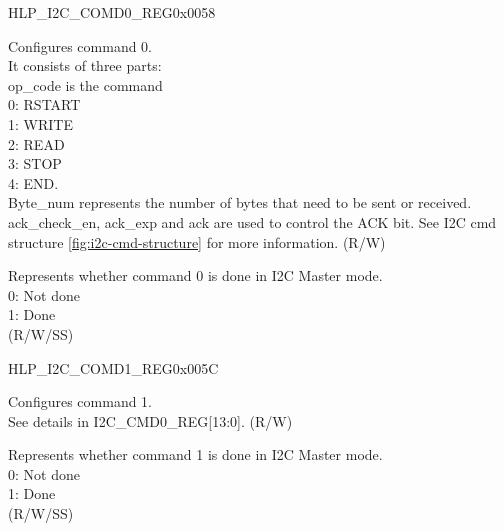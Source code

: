 \begin{register}{H}{LP\_I2C\_COMD0\_REG}{0x0058}\label{regdesc:LPI2CCOMD0REG}
%
%
%
\regnewline%
\begin{regdesc}\begin{reglist}
\label{fielddesc:LPI2CCOMMAND0}\item [LP\_I2C\_COMMAND0] Configures command 0. \\
It consists of three parts:\\ 
op\_code is the command\\
0: RSTART\\ 
1: WRITE\\
2: READ\\
3: STOP\\
4: END.\\
Byte\_num represents the number of bytes that need to be sent or received.\\
ack\_check\_en, ack\_exp and ack are used to control the ACK bit. See I2C cmd structure \ref{fig:i2c-cmd-structure} for more information. (R/W)
\label{fielddesc:LPI2CCOMMAND0DONE}\item [LP\_I2C\_COMMAND0\_DONE] Represents whether command 0 is done in I2C Master mode.\\
0: Not done \\
1: Done \\ (R/W/SS)
\end{reglist}\end{regdesc}
\end{register}


\begin{register}{H}{LP\_I2C\_COMD1\_REG}{0x005C}\label{regdesc:LPI2CCOMD1REG}
%
%
%
\regnewline%
\begin{regdesc}\begin{reglist}
\label{fielddesc:LPI2CCOMMAND1}\item [LP\_I2C\_COMMAND1] Configures command 1.\\ 
See details in I2C\_CMD0\_REG[13:0]. (R/W)
\label{fielddesc:LPI2CCOMMAND1DONE}\item [LP\_I2C\_COMMAND1\_DONE] Represents whether command 1 is done in I2C Master mode.\\
0: Not done \\
1: Done \\ (R/W/SS)
\end{reglist}\end{regdesc}
\end{register}



